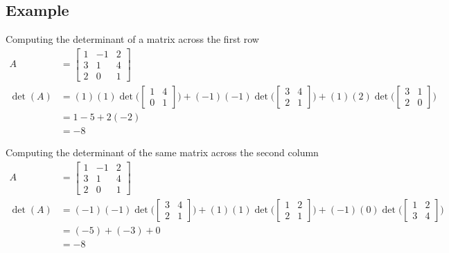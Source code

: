 \documentclass{article}
\theoremstyle{mytheoremstyle}
\theoremstyle{mytheoremstyle}
\theoremstyle{myproblemstyle}
\begin{document}
    \subsection*{Example}
    Computing the determinant of a matrix across the first row
    \begin{align*}
        A &= \begin{bmatrix}
            1 & -1 & 2 \\
            3 &  1 & 4 \\
            2 & 0 & 1
        \end{bmatrix} \\
        \det(A) &= (1)(1)\det\bigg(\begin{bmatrix}
            1 & 4 \\
            0 & 1
        \end{bmatrix}\bigg) + (-1)(-1)\det\bigg(\begin{bmatrix}
            3 & 4 \\
            2 & 1
        \end{bmatrix}\bigg) + (1)(2)\det\bigg(\begin{bmatrix}
            3 & 1 \\
            2 & 0
        \end{bmatrix}\bigg) \\
        &= 1-5+2(-2)  \\
        &= -8
    \end{align*}

    Computing the determinant of the same matrix across the second column
    \begin{align*}
        A &= \begin{bmatrix}
            1 & -1 & 2 \\
            3 &  1 & 4 \\
            2 & 0 & 1
        \end{bmatrix} \\
        \det(A) &= (-1)(-1)\det\bigg(\begin{bmatrix}
            3 & 4 \\
            2 & 1
        \end{bmatrix}\bigg) + (1)(1)\det\bigg(\begin{bmatrix}
            1 & 2 \\
            2 & 1
        \end{bmatrix}\bigg) + (-1)(0)\det\bigg(\begin{bmatrix}
            1 & 2 \\
            3 & 4
        \end{bmatrix}\bigg) \\
        &= (-5) + (-3) + 0 \\
        &= -8
    \end{align*}
\end{document}
